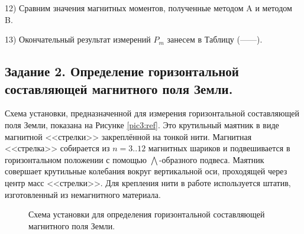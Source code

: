 \documentclass[a4paper,12pt]{article} %
\begin{document}
12) Сравним значения магнитных моментов, полученные методом A и методом B.

13) Окончательный результат измерений $P_m$ занесем в Таблицу (------).

\subsection{Задание 2. Определение горизонтальной составляющей магнитного поля Земли.}

Схема установки, предназначенной для измерения горизонтальной составляющей поля Земли, показана на Рисунке \eqref{pic3:ref}. Это крутильный маятник в виде магнитной <<стрелки>> закреплённой на тонкой нити. Магнитная <<стрелка>> собирается из $n = 3..12$ магнитных шариков и подвешивается в горизонтальном положении с помощью $\bigwedge$-образного подвеса. Маятник совершает крутильные колебания вокруг вертикальной оси, проходящей через центр масс <<стрелки>>. Для крепления нити в работе используется штатив, изготовленный из немагнитного материала.

\begin{figure}[H]
\noindent{}
\caption{Схема установки для определения горизонтальной составляющей магнитного поля Земли.}
\label{pic3:ref}
\end{figure}
\end{document}
